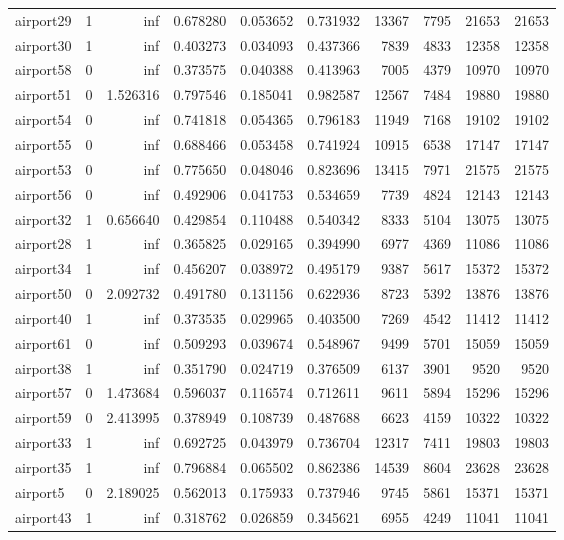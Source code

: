\begin{longtable}{|l|r|r|r|r|r|r|r|r|r|}
airport29 & 1 & inf & 0.678280 & 0.053652 & 0.731932 & 13367 & 7795 & 21653 & 21653 \\
airport30 & 1 & inf & 0.403273 & 0.034093 & 0.437366 & 7839 & 4833 & 12358 & 12358 \\
airport58 & 0 & inf & 0.373575 & 0.040388 & 0.413963 & 7005 & 4379 & 10970 & 10970 \\
airport51 & 0 & 1.526316 & 0.797546 & 0.185041 & 0.982587 & 12567 & 7484 & 19880 & 19880 \\
airport54 & 0 & inf & 0.741818 & 0.054365 & 0.796183 & 11949 & 7168 & 19102 & 19102 \\
airport55 & 0 & inf & 0.688466 & 0.053458 & 0.741924 & 10915 & 6538 & 17147 & 17147 \\
airport53 & 0 & inf & 0.775650 & 0.048046 & 0.823696 & 13415 & 7971 & 21575 & 21575 \\
airport56 & 0 & inf & 0.492906 & 0.041753 & 0.534659 & 7739 & 4824 & 12143 & 12143 \\
airport32 & 1 & 0.656640 & 0.429854 & 0.110488 & 0.540342 & 8333 & 5104 & 13075 & 13075 \\
airport28 & 1 & inf & 0.365825 & 0.029165 & 0.394990 & 6977 & 4369 & 11086 & 11086 \\
airport34 & 1 & inf & 0.456207 & 0.038972 & 0.495179 & 9387 & 5617 & 15372 & 15372 \\
airport50 & 0 & 2.092732 & 0.491780 & 0.131156 & 0.622936 & 8723 & 5392 & 13876 & 13876 \\
airport40 & 1 & inf & 0.373535 & 0.029965 & 0.403500 & 7269 & 4542 & 11412 & 11412 \\
airport61 & 0 & inf & 0.509293 & 0.039674 & 0.548967 & 9499 & 5701 & 15059 & 15059 \\
airport38 & 1 & inf & 0.351790 & 0.024719 & 0.376509 & 6137 & 3901 & 9520 & 9520 \\
airport57 & 0 & 1.473684 & 0.596037 & 0.116574 & 0.712611 & 9611 & 5894 & 15296 & 15296 \\
airport59 & 0 & 2.413995 & 0.378949 & 0.108739 & 0.487688 & 6623 & 4159 & 10322 & 10322 \\
airport33 & 1 & inf & 0.692725 & 0.043979 & 0.736704 & 12317 & 7411 & 19803 & 19803 \\
airport35 & 1 & inf & 0.796884 & 0.065502 & 0.862386 & 14539 & 8604 & 23628 & 23628 \\
airport5 & 0 & 2.189025 & 0.562013 & 0.175933 & 0.737946 & 9745 & 5861 & 15371 & 15371 \\
airport43 & 1 & inf & 0.318762 & 0.026859 & 0.345621 & 6955 & 4249 & 11041 & 11041 \\

\end{longtable}
